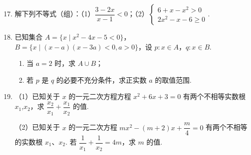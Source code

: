 \documentclass[a4paper,11pt]{article}
\begin{document}
\begin{enumerate}
\end{enumerate}


\begin{enumerate}
\setcounter{enumi}{16}

\item 解下列不等式（组）：（1）$\dfrac{3-2x}{x-1}<0$；（2）$\begin{cases}6+x-x^2>0\\ 2x^2-x-6\geqslant0\end{cases}$.

\ifanswer
\ans{（1）$(-\infty,1)\cup\left(\dfrac32,+\infty\right)$；（2）$\left(-2,-\dfrac32\right]\cup[2,3)$}
\fi

\ansspace[6]

\item 已知集合 $A=\{x\mid x^2-4x-5<0\}$，$B=\{x\mid(x-a)(x-3a)<0,a>0\}$，设 $p:x\in A$，$q:x\in B$.

\begin{enumerate}[label=(\arabic*)]
\item 当 $a=2$ 时，求 $A\cup B$；
\item 若 $p$ 是 $q$ 的必要不充分条件，求正实数 $a$ 的取值范围.
\end{enumerate}

\ifanswer
\solbegin
{}
\step{所以正数 $a$ 的取值范围为 $\left(0,\dfrac53\right]$.}
\solend
\fi

\ansspace[6]

\item （1）已知关于 $x$ 的一元二次方程方程 $x^2+6x+3=0$ 有两个不相等实数根 $x_1$,$x_2$，求 $\dfrac{x_2}{x_1}+\dfrac{x_1}{x_2}$ 的值.

（2）已知关于 $x$ 的一元二次方程 $mx^2-(m+2)x+\dfrac m4=0$ 有两个不相等的实数根 $x_1$、$x_2$. 若 $\dfrac1{x_1}+\dfrac1{x_2}=4m$，求 $m$ 的值.

\ifanswer
\solbegin
{}
\solend
\fi


\end{enumerate}
\end{document}
